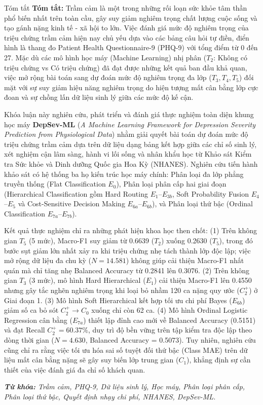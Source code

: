 \documentclass{uetgraduation}
\begin{document}
\begin{preamble}{Tóm tắt}
\textbf{Tóm tắt:} Trầm cảm là một trong những rối loạn sức khỏe tâm thần phổ biến nhất trên toàn cầu, gây suy giảm nghiêm trọng chất lượng cuộc sống và tạo gánh nặng kinh tế - xã hội to lớn. Việc đánh giá mức độ nghiêm trọng của triệu chứng trầm cảm hiện nay chủ yếu dựa vào các bảng câu hỏi tự điền, điển hình là thang đo Patient Health Questionnaire-9 (PHQ-9) với tổng điểm từ 0 đến 27. Mặc dù các mô hình học máy (Machine Learning) nhị phân ($T_2$: Không có triệu chứng vs Có triệu chứng) đã đạt được những kết quả ban đầu khả quan, việc mở rộng bài toán sang dự đoán mức độ nghiêm trọng đa lớp ($T_3, T_4, T_5$) đối mặt với sự suy giảm hiệu năng nghiêm trọng do hiện tượng mất cân bằng lớp cực đoan và sự chồng lấn dữ liệu sinh lý giữa các mức độ kế cận.

Khóa luận này nghiên cứu, phát triển và đánh giá thực nghiệm toàn diện khung học máy \textbf{DepSev-ML} (\textit{A Machine Learning Framework for Depression Severity Prediction from Physiological Data}) nhằm giải quyết bài toán dự đoán mức độ triệu chứng trầm cảm dựa trên dữ liệu dạng bảng kết hợp giữa các chỉ số sinh lý, xét nghiệm cận lâm sàng, hành vi lối sống và nhân khẩu học từ Khảo sát Kiểm tra Sức khỏe và Dinh dưỡng Quốc gia Hoa Kỳ (NHANES). Nghiên cứu tiến hành khảo sát có hệ thống ba họ kiến trúc học máy chính: Phân loại đa lớp phẳng truyền thống (Flat Classification $E_0$), Phân loại phân cấp hai giai đoạn (Hierarchical Classification gồm Hard Routing $E_1$--$E_{3b}$, Soft Probability Fusion $E_4$--$E_5$ và Cost-Sensitive Decision Making $E_{6a}$--$E_{6b}$), và Phân loại thứ bậc (Ordinal Classification $E_{7a}$--$E_{7b}$).

Kết quả thực nghiệm chỉ ra những phát hiện khoa học then chốt: (1) Trên không gian $T_5$ (5 mức), Macro-F1 suy giảm từ 0.6639 ($T_2$) xuống 0.2630 ($T_5$), trong đó bước sụt giảm lớn nhất xảy ra khi triệu chứng nhẹ tách thành lớp độc lập; việc mở rộng dữ liệu đa chu kỳ ($N = 14.581$) không giúp cải thiện Macro-F1 nhất quán mà chỉ tăng nhẹ Balanced Accuracy từ 0.2841 lên 0.3076. (2) Trên không gian $T_3$ (3 mức), mô hình Hard Hierarchical ($E_1$) cải thiện Macro-F1 lên 0.4550 nhưng gây tắc nghẽn nghiêm trọng khi loại bỏ nhầm 120 ca nặng quy ước ($C_2^+$) ở Giai đoạn 1. (3) Mô hình Soft Hierarchical kết hợp tối ưu chi phí Bayes ($E_{6b}$) giảm số ca bỏ sót $C_2^+ \to C_0$ xuống chỉ còn 62 ca. (4) Mô hình Ordinal Logistic Regression cân bằng ($E_{7a}$) thiết lập đỉnh cao mới về Balanced Accuracy (0.5151) và đạt Recall $C_2^+ = 60.37\%$, duy trì độ bền vững trên tập kiểm tra độc lập theo dòng thời gian ($N = 4.630$, Balanced Accuracy = 0.5073). Tuy nhiên, nghiên cứu cũng chỉ ra rằng việc tối ưu hóa sai số tuyệt đối thứ bậc (Class MAE) trên dữ liệu mất cân bằng nặng sẽ gây suy biến lớp trung gian ($C_1$), khẳng định sự cần thiết của việc đánh giá đa chỉ số khách quan.

\vspace{0.8cm}
\noindent \textit{\textbf{Từ khóa:} Trầm cảm, PHQ-9, Dữ liệu sinh lý, Học máy, Phân loại phân cấp, Phân loại thứ bậc, Quyết định nhạy chi phí, NHANES, DepSev-ML.}
\end{preamble}
\end{document}
